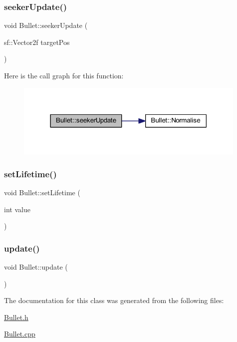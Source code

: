 \subsubsection{\texorpdfstring{seeker\+Update()}{seekerUpdate()}}
{\footnotesize\ttfamily void Bullet\+::seeker\+Update (\begin{DoxyParamCaption}\item[{sf\+::\+Vector2f}]{target\+Pos }\end{DoxyParamCaption})}

Here is the call graph for this function\+:
\nopagebreak
\begin{figure}[H]
\begin{center}
\leavevmode
\includegraphics[width=314pt]{class_bullet_add6e90fd23ded0a93ceaa2d489060591_cgraph}
\end{center}
\end{figure}
\mbox{\label{class_bullet_ae26b908cf0b00513a84cbfeb6582dfed}} 
\subsubsection{\texorpdfstring{set\+Lifetime()}{setLifetime()}}
{\footnotesize\ttfamily void Bullet\+::set\+Lifetime (\begin{DoxyParamCaption}\item[{int}]{value }\end{DoxyParamCaption})}

\mbox{\label{class_bullet_a32f4a0611fe2dd245fee955d14ca1f68}} 
\subsubsection{\texorpdfstring{update()}{update()}}
{\footnotesize\ttfamily void Bullet\+::update (\begin{DoxyParamCaption}{ }\end{DoxyParamCaption})}



The documentation for this class was generated from the following files\+:\begin{DoxyCompactItemize}
\item 
\hyperlink{_bullet_8h}{Bullet.\+h}\item 
\hyperlink{_bullet_8cpp}{Bullet.\+cpp}\end{DoxyCompactItemize}
